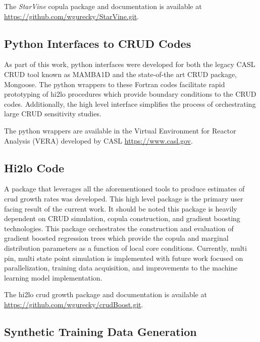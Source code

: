 The \emph{StarVine} copula package and documentation is available at \url{https://github.com/wgurecky/StarVine.git}.

\subsection{Python Interfaces to CRUD Codes}

As part of this work, python interfaces were developed for both the legacy CASL CRUD tool known as MAMBA1D and the state-of-the art CRUD package, Mongoose.  The python wrappers to these Fortran codes facilitate rapid prototyping of hi2lo procedures which provide boundary conditions to the CRUD codes.  Additionally, the high level interface simplifies the process of orchestrating large CRUD sensitivity studies.

The python wrappers are available in the Virtual Environment for Reactor Analysis (VERA) developed by CASL \url{https://www.casl.gov}.

\subsection{Hi2lo Code}

A package that leverages all the aforementioned tools to produce estimates of crud growth rates was developed.  This high level package is the primary user facing result of the current work.  It should be noted this package is heavily dependent on CRUD simulation, copula construction, and gradient boosting technologies.
This package orchestrates the construction and evaluation of gradient boosted regression trees which provide the copula and marginal distribution parameters as a function of local core conditions.
Currently, multi pin, multi state point simulation is implemented with future work focused on parallelization, training data acquisition, and improvements to the machine learning model implementation.

The hi2lo crud growth package and documentation is available at \url{https://github.com/wgurecky/crudBoost.git}.


\subsection{Synthetic Training Data Generation}
\label{chap:synth}

